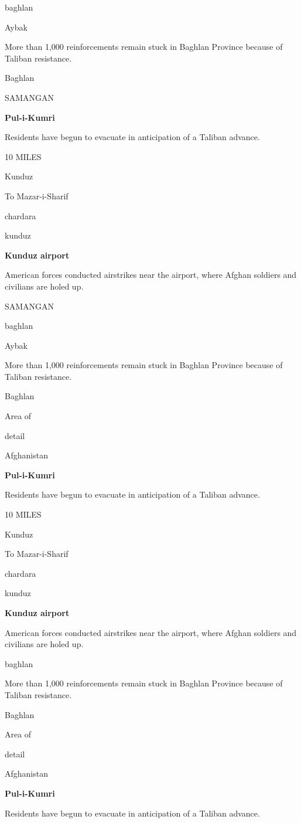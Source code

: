 baghlan

Aybak

More than 1,000 reinforcements remain stuck in Baghlan Province because
of Taliban resistance.

Baghlan

SAMANGAN

\textbf{Pul-i-Kumri}

Residents have begun to evacuate in anticipation of a Taliban advance.

10 MILES

Kunduz

To Mazar-i-Sharif

chardara

kunduz

\textbf{Kunduz airport}

American forces conducted airstrikes near the airport, where Afghan
soldiers and civilians are holed up.

SAMANGAN

baghlan

Aybak

More than 1,000 reinforcements remain stuck in Baghlan Province because
of Taliban resistance.

Baghlan

Area of

detail

Afghanistan

\textbf{Pul-i-Kumri}

Residents have begun to evacuate in anticipation of a Taliban advance.

10 MILES

Kunduz

To Mazar-i-Sharif

chardara

kunduz

\textbf{Kunduz airport}

American forces conducted airstrikes near the airport, where Afghan
soldiers and civilians are holed up.

baghlan

More than 1,000 reinforcements remain stuck in Baghlan Province because
of Taliban resistance.

Baghlan

Area of

detail

Afghanistan

\textbf{Pul-i-Kumri}

Residents have begun to evacuate in anticipation of a Taliban advance.

